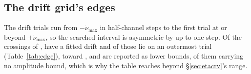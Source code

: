 \subsection{The drift grid's edges}
\label{sec:edge}

The drift trials run from $-\dot\nu_{\max}$ in half-channel steps to the
first trial at or beyond $+\dot\nu_{\max}$, so the searched interval is
asymmetric by up to one step. Of the \EgNPop{} crossings of \EgDriftPop,
\EgNDrift{} have a fitted drift and \EgNEdge{} of those lie on an outermost
trial (Table~\ref{tab:edge}), toward
\EgEdgeStars, and are reported as lower bounds, \EgNEdgeOut{} of them carrying
no amplitude bound, which is why the table reaches beyond
\S\ref{sec:etacrv}'s range.

\begin{table}
\caption{The crossings whose fitted drift lies on an outermost trial of
their window's own grid. Frequencies are in the star's rest frame, rates in
the observatory frame.}
\label{tab:edge}
\footnotesize

\end{table}
